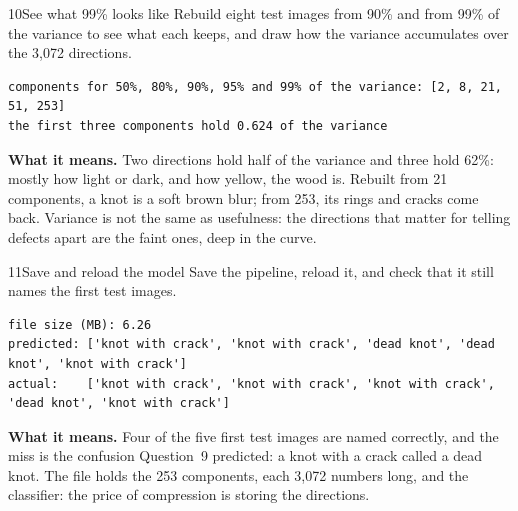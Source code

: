 \begin{labquestion}{10}{See what 99\% looks like}
Rebuild eight test images from 90\% and from 99\% of the variance to see what each keeps, and draw how the variance accumulates over the 3,072 directions.
\end{labquestion}
\begin{labanswer}

\begin{refoutput}
\begin{lstlisting}[style=utpterminal]
components for 50%, 80%, 90%, 95% and 99% of the variance: [2, 8, 21, 51, 253]
the first three components hold 0.624 of the variance
\end{lstlisting}
\end{refoutput}

\textbf{What it means.} Two directions hold half of the variance and three hold 62\%: mostly how light or dark, and how yellow, the wood is. Rebuilt from 21 components, a knot is a soft brown blur; from 253, its rings and cracks come back. Variance is not the same as usefulness: the directions that matter for telling defects apart are the faint ones, deep in the curve.
\end{labanswer}

\begin{labquestion}{11}{Save and reload the model}
Save the pipeline, reload it, and check that it still names the first test images.
\end{labquestion}
\begin{labanswer}

\begin{refoutput}
\begin{lstlisting}[style=utpterminal]
file size (MB): 6.26
predicted: ['knot with crack', 'knot with crack', 'dead knot', 'dead knot', 'knot with crack']
actual:    ['knot with crack', 'knot with crack', 'knot with crack', 'dead knot', 'knot with crack']
\end{lstlisting}
\end{refoutput}

\textbf{What it means.} Four of the five first test images are named correctly, and the miss is the confusion Question~9 predicted: a knot with a crack called a dead knot. The file holds the 253 components, each 3,072 numbers long, and the classifier: the price of compression is storing the directions.
\end{labanswer}

